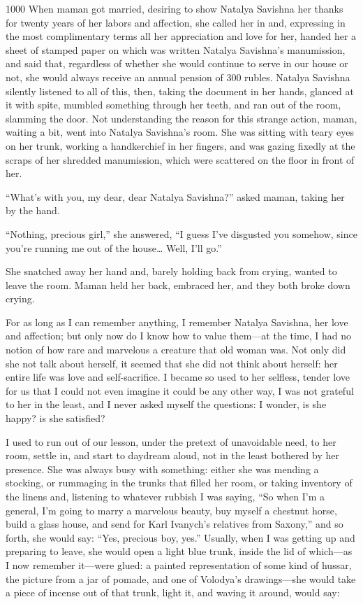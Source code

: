 \begin{tolerant}{1000}
When maman got married, desiring to show Natalya Savishna her thanks for twenty years of her labors and affection, she called her in and, expressing in the most complimentary terms all her appreciation and love for her, handed her a sheet of stamped paper on which was written Natalya Savishna's manumission, and said that, regardless of whether she would continue to serve in our house or not, she would always receive an annual pension of 300 rubles. Natalya Savishna silently listened to all of this, then, taking the document in her hands, glanced at it with spite, mumbled something through her teeth, and ran out of the room, slamming the door. Not understanding the reason for this strange action, maman, waiting a bit, went into Natalya Savishna's room. She was sitting with teary eyes on her trunk, working a handkerchief in her fingers, and was gazing fixedly at the scraps of her shredded manumission, which were scattered on the floor in front of her.
\end{tolerant}

``What's with you, my dear, dear Natalya Savishna?'' asked maman, taking her by the hand. %

``Nothing, precious girl,'' she answered, ``I guess I've disgusted you somehow, since you're running me out of the house\ldots{} Well, I'll go.'' %

She snatched away her hand and, barely holding back from crying, wanted to leave the room. Maman held her back, embraced her, and they both broke down crying.

For as long as I can remember anything, I remember Natalya Savishna, her love and affection; but only now do I know how to value them---at the time, I had no notion of how rare and marvelous a creature that old woman was. Not only did she not talk about herself, it seemed that she did not think about herself: her entire life was love and self-sacrifice. I became so used to her selfless, tender love for us that I could not even imagine it could be any other way, I was not grateful to her in the least, and I never asked myself the questions: I wonder, is she happy? is she satisfied?

I used to run out of our lesson, under the pretext of unavoidable need, to her room, settle in, and start to daydream aloud, not in the least bothered by her presence. She was always busy with something: either she was mending a stocking, or rummaging in the trunks that filled her room, or taking inventory of the linens and, listening to whatever rubbish I was saying, ``So when I'm a general, I'm going to marry a marvelous beauty, buy myself a chestnut horse, build a glass house, and send for Karl Ivanych's relatives from Saxony,'' and so forth, she would say: ``Yes, precious boy, yes.'' Usually, when I was getting up and preparing to leave, she would open a light blue trunk, inside the lid of which---as I now remember it---were glued: a painted representation of some kind of hussar, the picture from a jar of pomade, and one of Volodya's drawings---she would take a piece of incense out of that trunk, light it, and waving it around, would say:

